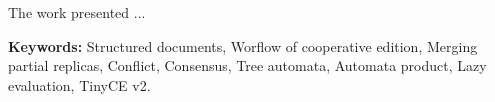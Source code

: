 The work presented ...

\vspace{1cm}
\noindent\textbf{Keywords:} Structured documents, Worflow of cooperative edition, Merging partial replicas, Conflict, Consensus, Tree automata, Automata product, Lazy evaluation, TinyCE v2.
